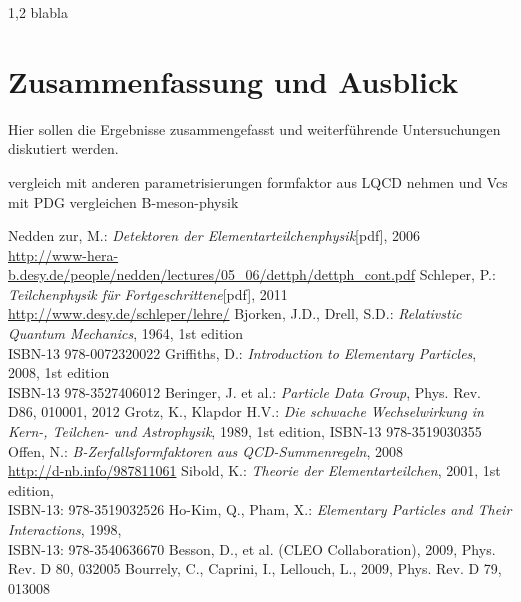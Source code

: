 \documentclass[11pt,a4paper,twoside]{report}
\begin{document}
\begin{spacing}{1,2}
blabla

\chapter{Zusammenfassung und Ausblick}

Hier sollen die Ergebnisse zusammengefasst und weiterf\"uhrende Untersuchungen diskutiert werden. 

vergleich mit anderen parametrisierungen
formfaktor aus LQCD nehmen und Vcs mit PDG vergleichen
B-meson-physik

\begin{appendix}
%
\end{appendix}
\newpage


\renewcommand{\bibname}{Literaturverzeichnis}
\addcontentsline{toc}{chapter}{\bibname}
% 
%
\begin{thebibliography}{xxx}
 Nedden zur, M.: \textit{Detektoren der Elementarteilchenphysik}[pdf], 2006\\ \href{http://www-hera-b.desy.de/people/nedden/lectures/05_06/dettph/dettph_cont.pdf}{http://www-hera-b.desy.de/people/nedden/lectures/05\_06/dettph/dettph\_cont.pdf}
 Schleper, P.: \textit{Teilchenphysik für Fortgeschrittene}[pdf], 2011\\ \href{http://www.desy.de/~schleper/lehre/}{http://www.desy.de/\midtilde schleper/lehre/}
 Bjorken, J.D., Drell, S.D.: \textit{Relativstic Quantum Mechanics}, 1964, 1st edition \\ISBN-13 978-0072320022 
 Griffiths, D.: \textit{Introduction to Elementary Particles}, 2008, 1st edition \\ISBN-13 978-3527406012
  Beringer, J. et al.: \textit{Particle Data Group}, Phys. Rev. D86, 010001, 2012
 Grotz, K., Klapdor H.V.: \textit{Die schwache Wechselwirkung in Kern-, Teilchen- und Astrophysik}, 1989, 1st edition, ISBN-13 978-3519030355
 Offen, N.: \textit{B-Zerfallsformfaktoren aus QCD-Summenregeln}, 2008\\ \href{http://d-nb.info/987811061}{http://d-nb.info/987811061}
 Sibold, K.: \textit{Theorie der Elementarteilchen}, 2001, 1st edition, \\ISBN-13: 978-3519032526
 Ho-Kim, Q., Pham, X.: \textit{Elementary Particles and Their Interactions}, 1998, \\ ISBN-13: 978-3540636670
 Besson, D., et al. (CLEO Collaboration), 2009, Phys. Rev. D 80, 032005 
 Bourrely, C., Caprini, I., Lellouch, L., 2009, Phys. Rev. D 79, 013008
\end{thebibliography}



\newpage
\thispagestyle{empty}
\ \\



\end{spacing}
\end{document}
